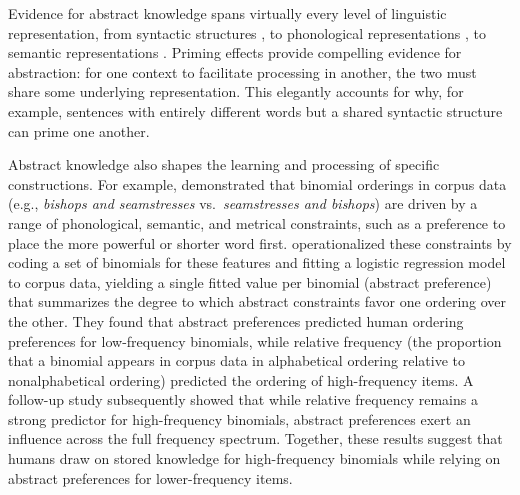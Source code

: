 \documentclass{article}
\begin{document}
Evidence for abstract knowledge spans virtually every level of
linguistic representation, from syntactic structures \citep[evidenced by
syntactic priming,][]{bock1986syntacticpersistencelanguage}, to
phonological representations \citep[evidenced by phonological
priming,][]{goldinger1992formbasedprimingspoken}, to semantic
representations \citep{meyer1971facilitationrecognizingpairs}. Priming
effects provide compelling evidence for abstraction: for one context to
facilitate processing in another, the two must share some underlying
representation. This elegantly accounts for why, for example, sentences
with entirely different words but a shared syntactic structure can prime
one another.

Abstract knowledge also shapes the learning and processing of specific
constructions. For example, \citet{benorChickenEggProbabilistic2006}
demonstrated that binomial orderings in corpus data (e.g., \emph{bishops
and seamstresses} vs.~\emph{seamstresses and bishops}) are driven by a
range of phonological, semantic, and metrical constraints, such as a
preference to place the more powerful or shorter word first.
\citet{morgan2016abstractknowledgedirect} operationalized these
constraints by coding a set of binomials for these features and fitting
a logistic regression model to corpus data, yielding a single fitted
value per binomial (abstract preference) that summarizes the degree to
which abstract constraints favor one ordering over the other. They found
that abstract preferences predicted human ordering preferences for
low-frequency binomials, while relative frequency (the proportion that a
binomial appears in corpus data in alphabetical ordering relative to
nonalphabetical ordering) predicted the ordering of high-frequency
items. A follow-up study
\citep{morgan2024productiveknowledgeitemspecific} subsequently showed
that while relative frequency remains a strong predictor for
high-frequency binomials, abstract preferences exert an influence across
the full frequency spectrum. Together, these results suggest that humans
draw on stored knowledge for high-frequency binomials while relying on
abstract preferences for lower-frequency items.
\end{document}
